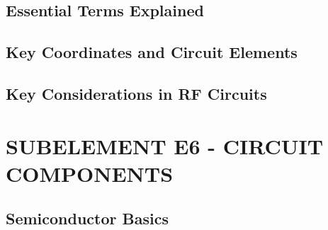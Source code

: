 \documentclass[12pt]{book}
\begin{document}
\section{Essential Terms Explained}












\section{Key Coordinates and Circuit Elements}












\section{Key Considerations in RF Circuits}












\chapter{SUBELEMENT E6 - CIRCUIT COMPONENTS}
\section{Semiconductor Basics}












\end{document}
